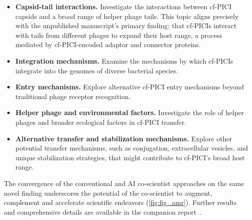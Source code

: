 \begin{itemize}
    \item \textbf{Capsid-tail interactions.} Investigate the interactions between cf-PICI capsids and a broad range of helper phage tails. This topic aligns precisely with the unpublished manuscript's primary finding: that cf-PICIs interact with tails from different phages to expand their host range, a process mediated by cf-PICI-encoded adaptor and connector proteins.
    \item \textbf{Integration mechanisms.} Examine the mechanisms by which cf-PICIs integrate into the genomes of diverse bacterial species.
    \item \textbf{Entry mechanisms.} Explore alternative cf-PICI entry mechanisms beyond traditional phage receptor recognition.
    \item \textbf{Helper phage and environmental factors.} Investigate the role of helper phages and broader ecological factors in cf-PICI transfer.
    \item \textbf{Alternative transfer and stabilization mechanisms.} Explore other potential transfer mechanisms, such as conjugation, extracellular vesicles, and unique stabilization strategies, that might contribute to cf-PICI's broad host range.
\end{itemize}

The convergence of the conventional and AI co-scientist approaches on the same novel finding underscores the potential of the co-scientist to augment, complement and accelerate scientific endeavors (\cref{fig:fig_amr}). Further results and comprehensive details are available in the companion report~\citep{penades2025ai}.
